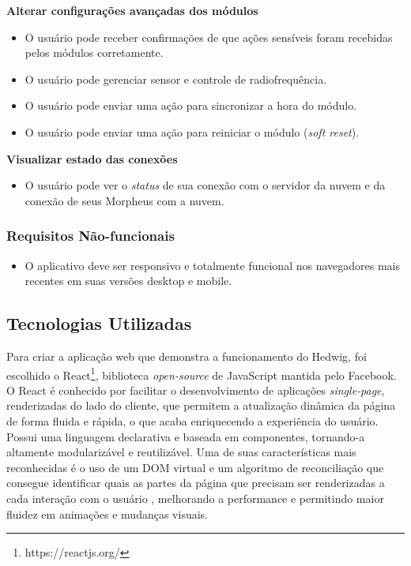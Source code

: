 \begin{description}
\item \textbf{Alterar configurações avançadas dos módulos}

\begin{itemize}
\item O usuário pode receber confirmações de que ações sensíveis foram recebidas pelos módulos corretamente.
\item O usuário pode gerenciar sensor e controle de radiofrequência.
\item O usuário pode enviar uma ação para sincronizar a hora do módulo.
\item O usuário pode enviar uma ação para reiniciar o módulo (\textit{soft reset}).
\end{itemize}

\item \textbf{Visualizar estado das conexões}

\begin{itemize}
\item O usuário pode ver o \textit{status} de sua conexão com o servidor da nuvem e da conexão de seus Morpheus com a nuvem.
\end{itemize}

\end{description}

\subsubsection{Requisitos Não-funcionais}

\begin{itemize}
\item O aplicativo deve ser responsivo e totalmente funcional nos navegadores mais recentes em suas versões desktop e mobile.
\end{itemize}

\subsection{Tecnologias Utilizadas}

Para criar a aplicação web que demonstra a funcionamento do Hedwig, foi escolhido o React\footnote{https://reactjs.org/}, biblioteca \emph{open-source} de JavaScript mantida pelo Facebook. O React é conhecido por facilitar o desenvolvimento de aplicações \textit{single-page}, renderizadas do lado do cliente, que permitem a atualização dinâmica da página de forma fluida e rápida, o que acaba enriquecendo a experiência do usuário. Possui uma linguagem declarativa e baseada em componentes, tornando-a altamente modularizável e reutilizável. Uma de suas características mais reconhecidas é o uso de um DOM virtual e um algoritmo de reconciliação que consegue identificar quais as partes da página que precisam ser renderizadas a cada interação com o usuário \cite{reactdiff}, melhorando a performance e permitindo maior fluidez em animações e mudanças visuais.

